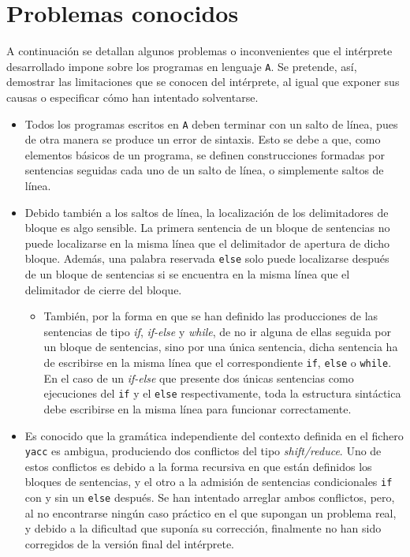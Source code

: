 \documentclass[12pt]{article}
\begin{document}
\section{Problemas conocidos}
A continuación se detallan algunos problemas o inconvenientes que el intérprete desarrollado impone sobre los programas en lenguaje \texttt{A}. Se pretende, así, demostrar las limitaciones que se conocen del intérprete, al igual que exponer sus causas o especificar cómo han intentado solventarse.
\begin{itemize}
    \item Todos los programas escritos en \texttt{A} deben terminar con un salto de línea, pues de otra manera se produce un error de sintaxis. Esto se debe a que, como elementos básicos de un programa, se definen construcciones formadas por sentencias seguidas cada uno de un salto de línea, o simplemente saltos de línea.\par
    \item Debido también a los saltos de línea, la localización de los delimitadores de bloque es algo sensible. La primera sentencia de un bloque de sentencias no puede localizarse en la misma línea que el delimitador de apertura de dicho bloque. Además, una palabra reservada \texttt{else} solo puede localizarse después de un bloque de sentencias si se encuentra en la misma línea que el delimitador de cierre del bloque.\par
    \begin{itemize}
        \item También, por la forma en que se han definido las producciones de las sentencias de tipo \textit{if}, \textit{if-else} y \textit{while}, de no ir alguna de ellas seguida por un bloque de sentencias, sino por una única sentencia, dicha sentencia ha de escribirse en la misma línea que el correspondiente \texttt{if}, \texttt{else} o \texttt{while}. En el caso de un \textit{if-else} que presente dos únicas sentencias como ejecuciones del \texttt{if} y el \texttt{else} respectivamente, toda la estructura sintáctica debe escribirse en la misma línea para funcionar correctamente.
    \end{itemize}
    \item Es conocido que la gramática independiente del contexto definida en el fichero \texttt{yacc} es ambigua, produciendo dos conflictos del tipo \textit{shift/reduce}. Uno de estos conflictos es debido a la forma recursiva en que están definidos los bloques de sentencias, y el otro a la admisión de sentencias condicionales \texttt{if} con y sin un \texttt{else} después. Se han intentado arreglar ambos conflictos, pero, al no encontrarse ningún caso práctico en el que supongan un problema real, y debido a la dificultad que suponía su corrección, finalmente no han sido corregidos de la versión final del intérprete.
\end{itemize}
\end{document}
